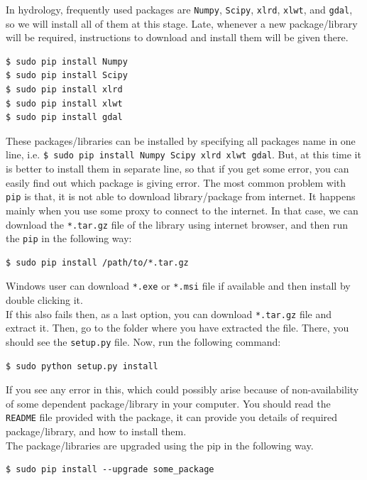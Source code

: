 \documentclass[10pt]{book}
\begin{document}
In hydrology, frequently used packages are \verb"Numpy", \verb"Scipy", \verb"xlrd", 
\verb"xlwt", and \verb"gdal", so we will install all of them at this stage. 
Late, whenever a new package/library will be required, instructions to download and 
install them will be given there. 
\beforeverb
\begin{verbatim}
$ sudo pip install Numpy
$ sudo pip install Scipy
$ sudo pip install xlrd
$ sudo pip install xlwt
$ sudo pip install gdal
\end{verbatim}
\afterverb
These packages/libraries can be installed by specifying all packages name in one line, 
i.e. \verb"$ sudo pip install Numpy Scipy xlrd xlwt gdal". 
But, at this time it is better to install them in separate line, 
so that if you get some error, you can easily find out which package is giving error.  
The most common problem with \verb"pip" is that, it is not able to download 
library/package from internet. It happens mainly when you use some proxy to connect
to the internet. In that case, we can download the \verb"*.tar.gz" file of the library 
using internet browser, and then run the \verb"pip" in the following way:
\beforeverb
\begin{verbatim}
$ sudo pip install /path/to/*.tar.gz
\end{verbatim}
\afterverb
Windows user can download \verb"*.exe" or \verb"*.msi" file if available and then 
install by double clicking it. \\

If this also fails then, as a last option, you can download \verb"*.tar.gz" file 
and extract it. Then, go to the folder where you have extracted the file. 
There, you should see the \verb"setup.py" file. Now, run the following command:
\beforeverb
\begin{verbatim}
$ sudo python setup.py install 
\end{verbatim}
\afterverb
If you see any error in this, which could possibly arise because of non-availability
of some dependent package/library in your computer. 
You should read the \verb"README" file provided with the package, 
it can provide you details of required package/library, and how to install them. \\

The package/libraries are upgraded using the pip in the following way.
\beforeverb
\begin{verbatim}
$ sudo pip install --upgrade some_package
\end{verbatim}
\afterverb
{}
\end{document}
